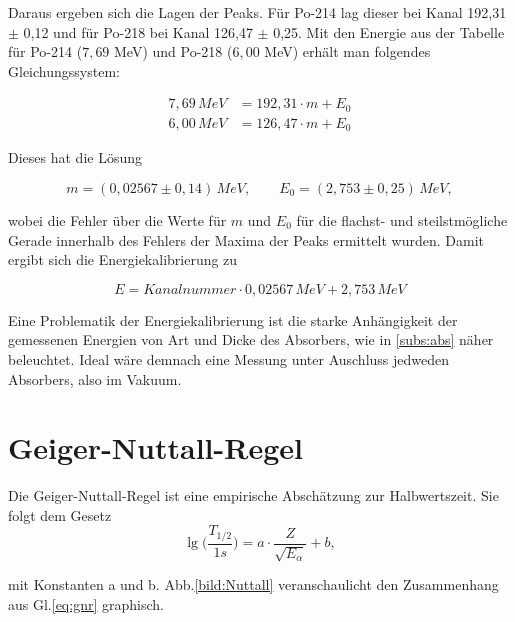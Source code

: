 Daraus ergeben sich die Lagen der Peaks. Für Po-214 lag dieser bei Kanal 192,31 $\pm$ 0,12  und 
für Po-218 bei Kanal 126,47 $\pm$ 0,25. Mit den Energie aus der Tabelle für Po-214 ($7,69$ MeV) und Po-218 ($6,00$ MeV) erhält man folgendes 
Gleichungssystem:

\begin{align*}
    7,69 \, MeV &= 192,31 \cdot m + E_0 \\
    6,00 \, MeV &= 126,47 \cdot m + E_0
\end{align*}

Dieses hat die Lösung

\begin{equation*}
    m = (0,02567 \pm 0,14) \, MeV, \qquad E_0 = (2,753 \pm 0,25) \, MeV,
\end{equation*}

wobei die Fehler über die Werte für $m$ und $E_0$ für die flachst- und steilstmögliche Gerade innerhalb des Fehlers der Maxima der Peaks ermittelt wurden. 
Damit ergibt sich die Energiekalibrierung zu

\begin{equation}
    E = Kanalnummer \cdot 0,02567 \, MeV + 2,753 \, MeV
\end{equation}

Eine Problematik der Energiekalibrierung ist die starke Anhängigkeit der gemessenen Energien von Art und Dicke des Absorbers, wie in 
\ref{subs:abs} näher beleuchtet. Ideal wäre demnach eine Messung unter Auschluss jedweden Absorbers, also im Vakuum.\\





\section{Geiger-Nuttall-Regel}

Die Geiger-Nuttall-Regel ist eine empirische Abschätzung zur Halbwertszeit. Sie folgt dem Gesetz
\begin{equation}
    \lg \biggl (\frac{T_{1/2}}{1s} \biggl ) = a \cdot \frac{Z}{\sqrt{E_{\alpha}}} + b,
    \label{eq:gnr}
\end{equation}


mit Konstanten a und b. Abb.\ref{bild:Nuttall} veranschaulicht den Zusammenhang aus Gl.\ref{eq:gnr} graphisch.\\

